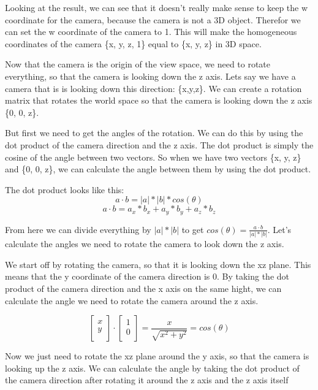\documentclass[12pt]{report} \usepackage{preamble}
\begin{document}
Looking at the result, we can see that it doesn't really make sense to keep
the w coordinate for the camera, because the camera is not a 3D object.
Therefor we can set the w coordinate of the camera to 1. This will make the homogeneous
coordinates of the camera \{x, y, z, 1\} equal to \{x, y, z\} in 3D space.

Now that the camera is the origin of the view space, we need to rotate everything,
so that the camera is looking down the z axis. Lets say we have a camera that is
is looking down this direction: \{x,y,z\}. We can create a rotation matrix that
rotates the world space so that the camera is looking down the z axis \{0, 0, z\}.

But first we need to get the angles of the rotation. We can do this by using the
dot product of the camera direction and the z axis. The dot product is simply the
cosine of the angle between two vectors. So when we have two vectors \{x, y, z\}
and \{0, 0, z\}, we can calculate the angle between them by using the dot product.

The dot product looks like this:
\[a \cdot b = |a| * |b| * cos(\theta)\]
\[a \cdot b = a_x * b_x + a_y * b_y + a_z * b_z\]

From here we can divide everything by \(|a| * |b|\) to get \(cos(\theta)= \frac{a \cdot b}{|a| * |b|}\).
Let's calculate the angles we need to rotate the camera to look down the z axis.

We start off by rotating the camera, so that it is looking down the xz plane.
This means that the y coordinate of the camera direction is 0. By taking the dot
product of the camera direction and the x axis on the same hight, we can calculate the angle
we need to rotate the camera around the z axis.

\[
	\begin{bmatrix}
		x \\
		y \\
	\end{bmatrix}
	\cdot
	\begin{bmatrix}
		1 \\
		0 \\
	\end{bmatrix}
	=
	\frac{x}{\sqrt{x^2 + y^2}}
	=
	cos(\theta)
\]

Now we just need to rotate the xz plane around the y axis, so that the camera is looking
up the z axis. We can calculate the angle by taking the dot product of the camera direction
after rotating it around the z axis and the z axis itself
\end{document}
